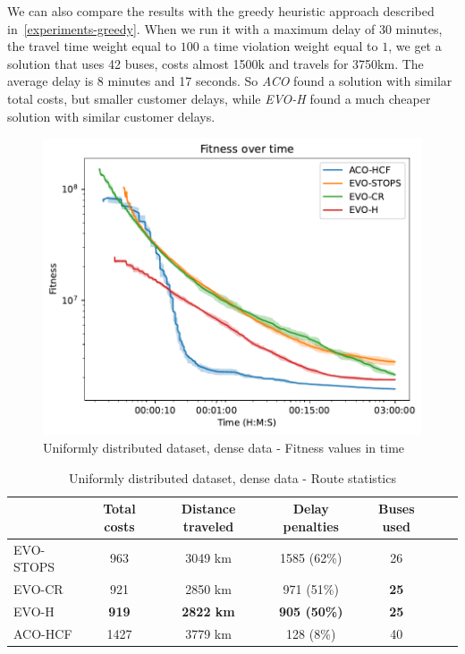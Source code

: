 We can also compare the results with the greedy heuristic approach described in~\ref{experiments-greedy}. When we run it with a maximum delay of 30 minutes, the travel time weight equal to $100$ a time violation weight equal to $1$, we get a solution that uses 42 buses, costs almost 1500k and travels for 3750km. The average delay is 8 minutes and 17 seconds. So \textit{ACO} found a solution with similar total costs, but smaller customer delays, while \textit{EVO-H} found a much cheaper solution with similar customer delays.

\clearpage

\begin{figure}
    \centering
    \includegraphics[width=1\linewidth]
    {img/exp_random_dense.pdf}
    \caption{Uniformly distributed dataset, dense data - Fitness values in time}
    \label{fig:exp_random_dense}
\end{figure}

\begin{table}
    \centering
    \begin{tabular}{lcccccc}
         & Total costs & Distance traveled & Delay penalties & Buses used \\
         \hline
         EVO-STOPS & 963 & 3049 km & 1585 (62\%) & 26 \\
         EVO-CR & 921 & 2850 km & 971 (51\%) & \textbf{25} \\
         EVO-H & \textbf{919} & \textbf{2822 km} & \textbf{905 (50\%)} & \textbf{25} \\
         ACO-HCF & 1427 & 3779 km & 128 (8\%) & 40 \\
    \end{tabular}
    \caption{Uniformly distributed dataset, dense data - Route statistics}
    \label{tab:exp_random_dense_route_stats}
\end{table}

